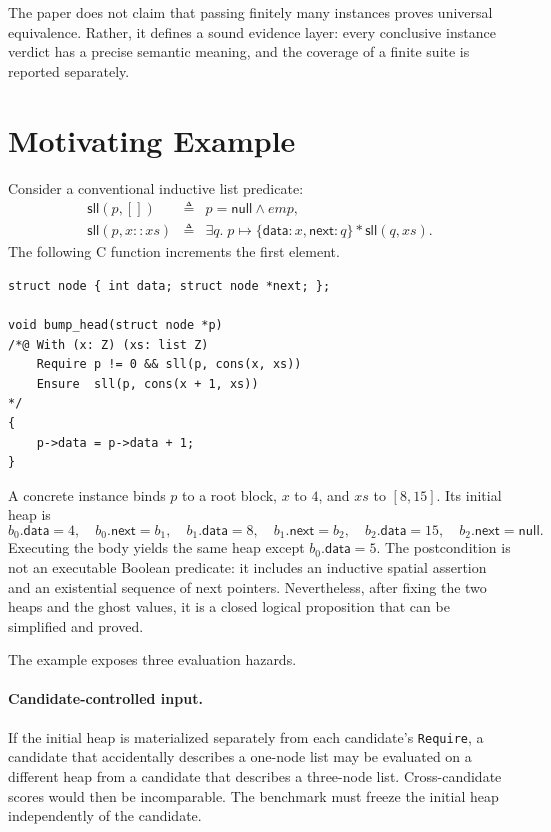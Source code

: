 \documentclass[10pt]{article}
\newcommand{\pto}{\mathrel{\mapsto}}
\begin{document}
The paper does not claim that passing finitely many instances proves universal
equivalence.  Rather, it defines a sound evidence layer: every conclusive
instance verdict has a precise semantic meaning, and the coverage of a finite
suite is reported separately.

\section{Motivating Example}
\label{sec:example}

Consider a conventional inductive list predicate:
\[
\begin{array}{rcl}
\mathsf{sll}(p,[]) &\triangleq& p=\mathsf{null}\land emp,\\
\mathsf{sll}(p,x::xs) &\triangleq&
  \exists q.\;p\pto\{\mathsf{data}:x,\mathsf{next}:q\}
  * \mathsf{sll}(q,xs).
\end{array}
\]
The following C function increments the first element.

\begin{lstlisting}
struct node { int data; struct node *next; };

void bump_head(struct node *p)
/*@ With (x: Z) (xs: list Z)
    Require p != 0 && sll(p, cons(x, xs))
    Ensure  sll(p, cons(x + 1, xs))
*/
{
    p->data = p->data + 1;
}
\end{lstlisting}

A concrete instance binds $p$ to a root block, $x$ to $4$, and $xs$ to
$[8,15]$.  Its initial heap is
\[
b_0.\mathsf{data}=4,\quad b_0.\mathsf{next}=b_1,\quad
b_1.\mathsf{data}=8,\quad b_1.\mathsf{next}=b_2,\quad
b_2.\mathsf{data}=15,\quad b_2.\mathsf{next}=\mathsf{null}.
\]
Executing the body yields the same heap except
$b_0.\mathsf{data}=5$.  The postcondition is not an executable Boolean
predicate: it includes an inductive spatial assertion and an existential
sequence of next pointers.  Nevertheless, after fixing the two heaps and the
ghost values, it is a closed logical proposition that can be simplified and
proved.

The example exposes three evaluation hazards.

\paragraph{Candidate-controlled input.}
If the initial heap is materialized separately from each candidate's
\texttt{Require}, a candidate that accidentally describes a one-node list may
be evaluated on a different heap from a candidate that describes a three-node
list.  Cross-candidate scores would then be incomparable.  The benchmark must
freeze the initial heap independently of the candidate.
\end{document}
